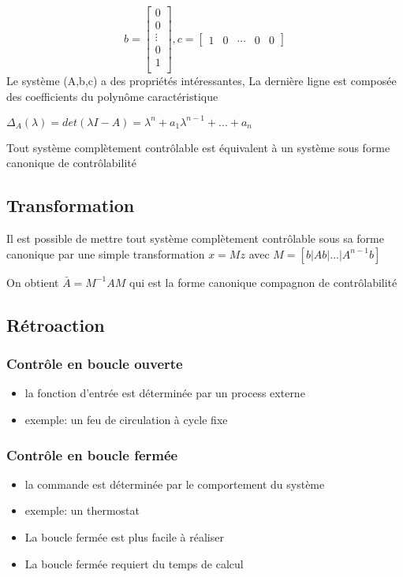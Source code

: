\documentclass[resume]{subfiles}
\begin{document}
$$b=\begin{bmatrix}
0 \\
0 \\
\vdots\\
0 \\
1 \\
\end{bmatrix},
c=\begin{bmatrix}
1&0&\cdots&0 &0
\end{bmatrix}
$$
Le système (A,b,c) a des propriétés intéressantes, La dernière ligne est composée des coefficients du polynôme caractéristique

$\Delta_A(\lambda) = det (\lambda I - A) = \lambda^n + a_1\lambda^{n-1} +...+ a_n  $ 

Tout système complètement contrôlable est équivalent à un système sous forme canonique de contrôlabilité

\subsection{Transformation}

Il est possible de mettre tout système complètement contrôlable sous sa forme canonique par une simple transformation $x=Mz$ avec $M=[b|Ab|...|A^{n-1}b]$ 

On obtient $\bar{A}= M^{-1}AM$ qui est la forme canonique compagnon de contrôlabilité

\subsection{Rétroaction}

\subsubsection{Contrôle en boucle ouverte}
\begin{itemize}
\item la fonction d'entrée est déterminée par un process
  externe
\item exemple: un feu de circulation à cycle fixe
\end{itemize}

\subsubsection{Contrôle en boucle fermée}
\begin{itemize}
\item la commande est déterminée par le comportement du
  système
\item exemple: un thermostat
\item La boucle fermée est plus facile à réaliser
\item La boucle fermée requiert du temps de calcul  
\end{itemize}
\end{document}
